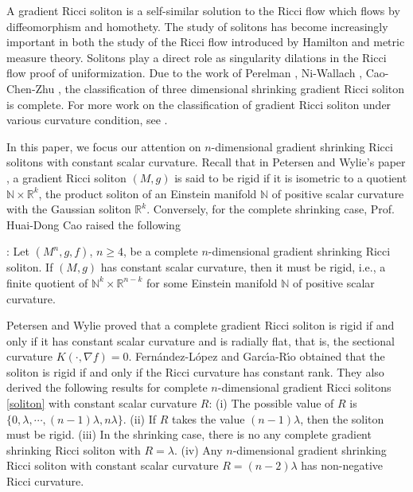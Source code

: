 \documentclass[12pt]{amsart}
\begin{document}
	A gradient Ricci soliton is a self-similar solution to the Ricci flow which flows by diffeomorphism and homothety. The study of solitons has become increasingly important in both the study of the Ricci flow introduced by Hamilton \cite{Hamilton} and metric measure theory. Solitons play a direct role as singularity dilations in the Ricci flow proof of uniformization.  Due to the work of Perelman \cite{Perelman2}, Ni-Wallach \cite{Ni-Wallach}, Cao-Chen-Zhu \cite{Cao-Chen-Zhu}, the classification of three dimensional shrinking gradient Ricci soliton is complete. For more work on the classification of gradient Ricci soliton under various curvature condition, see \cite{Brendle1, Brendle2, Cao-Chen, Cao-Chen2, Cao-Chen-Zhu, Cao-Xie, Cao-Wang-Zhang, Chen-Wang,Kotschwar, Eminenti-LaNave-Mantegazza,Munteanu-Wang4,  Naber, Petersen-Wylie, Pigola-Rimoldi-Setti, Wu-Zhang, Wu-Wu-Wylie,  Zhang}.
	
	

	\smallskip	
	In this paper, we focus our attention on $n$-dimensional gradient shrinking Ricci solitons with constant scalar curvature. Recall that in Petersen and Wylie's paper \cite{Petersen-Wylie}, a gradient Ricci soliton $(M, g)$ is said to be rigid if it is isometric to a quotient $\mathbb{N} \times \mathbb{R}^k$, the product soliton of an Einstein manifold $\mathbb{N}$ of positive scalar curvature with the Gaussian soliton $\mathbb{R}^k$.
	Conversely, for the complete shrinking case, Prof. Huai-Dong Cao raised the following
	
	\smallskip	
	:
	Let $(M^n, g, f)$, $n\geq 4$, be a complete $n$-dimensional gradient shrinking Ricci soliton. If $(M, g)$ has constant scalar curvature, then it must be rigid,
	i.e., a finite quotient of $\mathbb{N}^k\times \mathbb{R}^{n-k}$ for some Einstein manifold $\mathbb{N}$ of positive scalar curvature.
	
	\smallskip	
	Petersen and Wylie \cite{Petersen-Wylie} proved that a complete gradient Ricci soliton is rigid if and only if it has
	constant scalar curvature and is radially flat, that is, the sectional curvature $K(\cdot, \nabla f)=0$. Fern\'{a}ndez-L\'{o}pez and Garc\'\i a-R\'\i o \cite{FR16} obtained that the soliton is rigid if and only if the Ricci curvature has constant rank. They also derived the following results for complete $n$-dimensional gradient Ricci solitons \eqref{soliton} with constant scalar curvature $R$: (i) The possible value of $R$ is $\{0, \lambda, \cdots, (n-1)\lambda, n\lambda\}$. (ii) If $R$ takes the value $(n-1)\lambda$,  then the soliton must be rigid. (iii) In the shrinking case, there is  no any complete gradient shrinking Ricci soliton  with $R=\lambda$.
	(iv) Any $n$-dimensional gradient shrinking Ricci soliton with constant scalar curvature $R=(n-2)\lambda$ has non-negative Ricci curvature.
	
\end{document}
